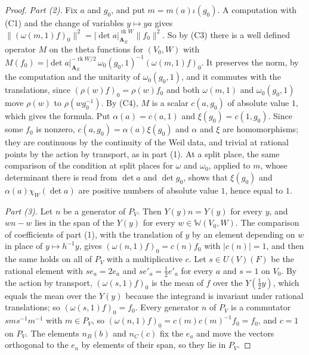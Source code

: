 \begin{proof}
\emph{Part (2).} Fix $a$ and $g_0$, and put $m=m(a)\iota(g_0)$. A computation
with (C1) and the change of variables $y\mapsto ya$ gives
$\|(\omega(m,1)f)_0\|^2=|\det a|_{\mathbf A_E}^{\operatorname{rk}W}\|f_0\|^2$.
So by (C3) there is a well defined operator $M$ on the theta functions for
$(V_0,W)$ with
$M(f_0)=|\det a|_{\mathbf A_E}^{-\operatorname{rk}W/2}\,\omega_0(g_0,1)^{-1}(\omega(m,1)f)_0$.
It preserves the norm, by the computation and the unitarity of
$\omega_0(g_0,1)$, and it commutes with the translations, since
$(\rho(w)f)_0=\rho(w)f_0$ and both $\omega(m,1)$ and $\omega_0(g_0,1)$ move
$\rho(w)$ to $\rho(wg_0^{-1})$. By (C4), $M$ is a scalar $c(a,g_0)$ of absolute
value $1$, which gives the formula. Put $\alpha(a)=c(a,1)$ and
$\xi(g_0)=c(1,g_0)$. Since some $f_0$ is nonzero,
$c(a,g_0)=\alpha(a)\xi(g_0)$ and $\alpha$ and $\xi$ are homomorphisms; they are
continuous by the continuity of the Weil data, and trivial at rational points
by the action by transport, as in part (1). At a split place, the same
comparison of the condition at split places for $\omega$ and $\omega_0$, applied
to $m$, whose determinant there is read from $\det a$ and $\det g_0$, shows that
$\xi(g_0)$ and $\alpha(a)\chi_W(\det a)$ are positive numbers of absolute value
$1$, hence equal to $1$.

\emph{Part (3).} Let $n$ be a generator of $P_V$. Then $Y(y)n=Y(y)$ for every
$y$, and $wn-w$ lies in the span of the $Y(y)$ for every $w\in\mathbb W(V_0,W)$.
The comparison of coefficients of part (1), with the translation of $y$ by an
element depending on $w$ in place of $y\mapsto h^{-1}y$, gives
$(\omega(n,1)f)_0=c(n)f_0$ with $|c(n)|=1$, and then the same holds on all of
$P_V$ with a multiplicative $c$. Let $s\in U(V)(F)$ be the rational element
with $se_a=2e_a$ and $se'_a=\tfrac12e'_a$ for every $a$ and $s=1$ on $V_0$. By
the action by transport, $(\omega(s,1)f)_0$ is the mean of $f$ over the
$Y(\tfrac12y)$, which equals the mean over the $Y(y)$ because the integrand is
invariant under rational translations; so $(\omega(s,1)f)_0=f_0$. Every
generator $n$ of $P_V$ is a commutator $sms^{-1}m^{-1}$ with $m\in P_V$, so
$(\omega(n,1)f)_0=c(m)c(m)^{-1}f_0=f_0$, and $c=1$ on $P_V$. The elements
$n_B(b)$ and $n_C(c)$ fix the $e_a$ and move the vectors orthogonal to the
$e_a$ by elements of their span, so they lie in $P_V$.
\end{proof}

